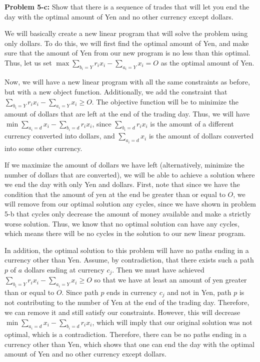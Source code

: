 \documentclass[psamsfonts]{amsart}
\newenvironment{sol}{\vspace{0.25cm}{\large \bfseries Solution:}}{\qedsymbol}
\newenvironment{prob}[1]{\begin{framed}{\large \bfseries Problem #1:}}{\end{framed}}
\begin{document}
\begin{prob}{5-c}
Show that there is a sequence of trades that will let you end the day with the optimal amount of Yen and no other currency except dollars.
\end{prob}
\begin{sol}
We will basically create a new linear program that will solve the problem using only dollars. To do this, we will first find the optimal amount of Yen, and make sure that the amount of Yen from our new program is no less than this optimal. Thus, let us set $\max \sum_{b_i = Y} r_i x_i - \sum_{a_i = Y} x_i = O$ as the optimal amount of Yen.

Now, we will have a new linear program with all the same constraints as before, but with a new object function. Additionally, we add the constraint that $\sum_{b_i = Y} r_i x_i - \sum_{a_i = Y} x_i \geq O$. The objective function will be to minimize the amount of dollars that are left at the end of the trading day. Thus, we will have $\min \sum_{a_i = d} x_i - \sum_{b_i = d} r_i x_i$, since $\sum_{b_i = d} r_i x_i$ is the amount of a different currency converted into dollars, and $\sum_{a_i = d} x_i$ is the amount of dollars converted into some other currency.

If we maximize the amount of dollars we have left (alternatively, minimize the number of dollars that are converted), we will be able to achieve a solution where we end the day with only Yen and dollars. First, note that since we have the condition that the amount of yen at the end be greater than or equal to $O$, we will remove from our optimal solution any cycles, since we have shown in problem 5-b that cycles only decrease the amount of money available and make a strictly worse solution. Thus, we know that no optimal solution can have any cycles, which means there will be no cycles in the solution to our new linear program.

In addition, the optimal solution to this problem will have no paths ending in a currency other than Yen. Assume, by contradiction, that there exists such a path $p$ of $a$ dollars ending at currency $c_j$. Then we must have achieved $\sum_{b_i = Y} r_i x_i - \sum_{a_i = Y} x_i \geq O$ so that we have at least an amount of yen greater than or equal to $O$. Since path $p$ ends in currency $c_j$ and not in Yen, path $p$ is not contributing to the number of Yen at the end of the trading day. Therefore, we can remove it and still satisfy our constraints. However, this will decrease $\min \sum_{a_i = d} x_i - \sum_{b_i = d} r_i x_i$, which will imply that our original solution was not optimal, which is a contradiction. Therefore, there can be no paths ending in a currency other than Yen, which shows that one can end the day with the optimal amount of Yen and no other currency except dollars.
\end{sol}
\end{document}
